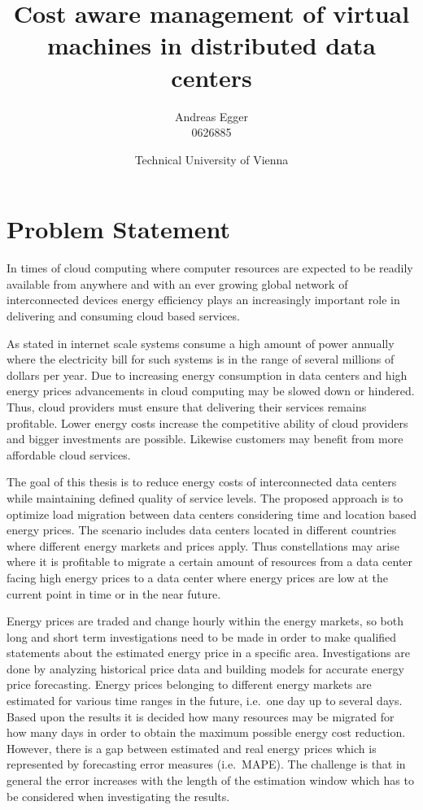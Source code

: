 \documentclass[a4paper]{article}
\title{Cost aware management of virtual machines in distributed data centers}
\author{Andreas Egger \\0626885}
\date{Technical University of Vienna}
\begin{document}
\maketitle


\section{Problem Statement}

In times of cloud computing where computer resources are expected to be readily available from anywhere \cite{buyya2009cloud} and with an ever growing global network of interconnected devices energy efficiency plays an increasingly important role in delivering and consuming cloud based services. 

As stated in \cite{qureshi2009cutting} internet scale systems consume a high amount of power annually where the electricity bill for such systems is in the range of several millions of dollars per year. Due to increasing energy consumption in data centers and high energy prices advancements in cloud computing may be slowed down or hindered. Thus, cloud providers must ensure that delivering their services remains profitable. Lower energy costs increase the competitive ability of cloud providers and bigger investments are possible. Likewise customers may benefit from more affordable cloud services. 


The goal of this thesis is to reduce energy costs of interconnected data centers while maintaining defined quality of service levels. The proposed approach is to optimize load migration between data centers considering time and location based energy prices. The scenario includes data centers located in different countries where different energy markets and prices apply. Thus constellations may arise where it is profitable to migrate a certain amount of resources from a data center facing high energy prices to a data center where energy prices are low at the current point in time or in the near future. 

Energy prices are traded and change hourly within the energy markets, so both long and short term investigations need to be made in order to make qualified statements about the estimated energy price in a specific area.
Investigations are done by analyzing historical price data and building models for accurate energy price forecasting. Energy prices belonging to different energy markets are estimated for various time ranges in the future, i.e.~one day up to several days. Based upon the results it is decided how many resources may be migrated for how many days in order to obtain the maximum possible energy cost reduction. However, there is a gap between estimated and real energy prices which is represented by forecasting error measures (i.e.~MAPE). The challenge is that in general the error increases with the length of the estimation window which has to be considered when investigating the results. 
\end{document}

